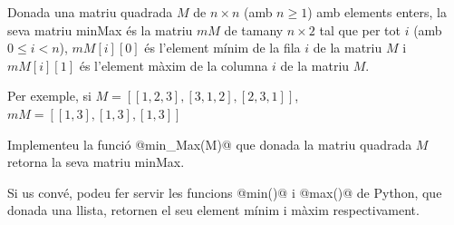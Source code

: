 
\UsePython

\Statement

Donada una matriu quadrada $M$ de $n\times n$ (amb $n\geq 1$) amb elements enters,
la seva matriu minMax és la matriu $mM$ de  tamany $n\times 2$ tal que per tot $i$ (amb $0\leq i < n$),
$mM[i][0]$ és l'element mínim de la fila $i$ de la matriu $M$ i $mM[i][1]$ és
l'element màxim de la columna $i$ de la matriu $M$.

\medskip

Per exemple, si $M = [[1,2,3],[3,1,2],[2,3,1]]$, $mM = [[1,3],[1,3],[1,3]]$

\medskip

Implementeu la funció @min_Max(M)@ que donada la matriu quadrada $M$
retorna la seva matriu minMax.

\medskip

Si us convé, podeu fer servir les funcions @min()@ i @max()@ de Python,
que donada una llista, retornen el seu element mínim i màxim respectivament.

\SampleSession
